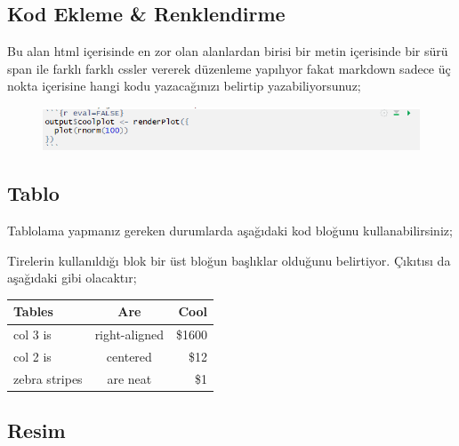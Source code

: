 \documentclass[]{book}
\newenvironment{Shaded}{\begin{snugshade}}{\end{snugshade}}
\newcommand{\NormalTok}[1]{#1}
\begin{document}
\subsection{Kod Ekleme \& Renklendirme}\label{kod-ekleme-renklendirme}

Bu alan html içerisinde en zor olan alanlardan birisi bir metin
içerisinde bir sürü span ile farklı farklı cssler vererek düzenleme
yapılıyor fakat markdown sadece üç nokta içerisine hangi kodu
yazacağınızı belirtip yazabiliyorsunuz;

\begin{figure}
\centering
\includegraphics{resim9.png}
\caption{}
\end{figure}

\subsection{Tablo}\label{tablo}

Tablolama yapmanız gereken durumlarda aşağıdaki kod bloğunu
kullanabilirsiniz;

\begin{Shaded}
\end{Shaded}

Tirelerin kullanıldığı blok bir üst bloğun başlıklar olduğunu
belirtiyor. Çıkıtısı da aşağıdaki gibi olacaktır;

\begin{longtable}[]{@{}lcr@{}}
\toprule
Tables & Are & Cool\tabularnewline
\midrule
\endhead
col 3 is & right-aligned & \$1600\tabularnewline
col 2 is & centered & \$12\tabularnewline
zebra stripes & are neat & \$1\tabularnewline
\bottomrule
\end{longtable}

\subsection{Resim}\label{resim}
\end{document}
